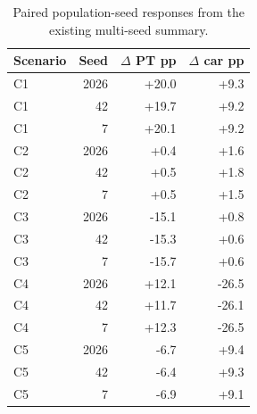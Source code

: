 \begin{table}[pos=htbp]
\centering\small
\caption{Paired population-seed responses from the existing multi-seed summary.}
\label{tab:seeds}
\begin{tabular}{@{}lrrr@{}}
\toprule
Scenario & Seed & $\Delta$ PT pp & $\Delta$ car pp \\
\midrule
C1 & 2026 & +20.0 & +9.3 \\
C1 & 42 & +19.7 & +9.2 \\
C1 & 7 & +20.1 & +9.2 \\
C2 & 2026 & +0.4 & +1.6 \\
C2 & 42 & +0.5 & +1.8 \\
C2 & 7 & +0.5 & +1.5 \\
C3 & 2026 & -15.1 & +0.8 \\
C3 & 42 & -15.3 & +0.6 \\
C3 & 7 & -15.7 & +0.6 \\
C4 & 2026 & +12.1 & -26.5 \\
C4 & 42 & +11.7 & -26.1 \\
C4 & 7 & +12.3 & -26.5 \\
C5 & 2026 & -6.7 & +9.4 \\
C5 & 42 & -6.4 & +9.3 \\
C5 & 7 & -6.9 & +9.1 \\
\bottomrule
\end{tabular}
\end{table}
